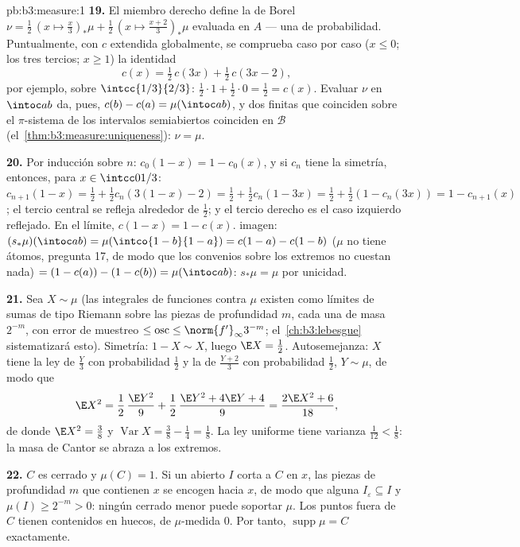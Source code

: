 \begin{solution}{pb:b3:measure:1}
\textbf{19.} El miembro derecho define la
 de Borel
$\nu = \frac12\,(x \mapsto \tfrac x3)_*\mu + \frac12\,(x
\mapsto \tfrac{x+2}3)_*\mu$ evaluada en $A$ --- una
 de probabilidad. Puntualmente,
con $c$ extendida globalmente, se comprueba caso por caso ($x \leq 0$;
los tres tercios; $x \geq 1$) la identidad
\[
c(x) = \tfrac12\,c(3x) + \tfrac12\,c(3x - 2),
\]
por ejemplo, sobre $\intcc{1/3}{2/3}$: $\frac12\cdot1 + \frac12\cdot0 =
\frac12 = c(x)$. Evaluar $\nu$ en $\intoc ab$ da, pues,
$c(b) - c(a) = \mu(\intoc ab)$, y dos
 finitas que coinciden sobre el
$\pi$-sistema de los intervalos semiabiertos coinciden en $\mathcal B$
(el~\cref{thm:b3:measure:uniqueness}): $\nu =
\mu$.

\textbf{20.} Por inducción sobre $n$: $c_0(1-x) = 1 - c_0(x)$, y si
$c_n$ tiene la simetría, entonces, para $x \in
\intcc0{1/3}$: $c_{n+1}(1 - x) = \frac12 + \frac12c_n(3(1-x)
- 2) = \frac12 + \frac12c_n(1 - 3x) = \frac12 + \frac12(1 -
c_n(3x)) = 1 - c_{n+1}(x)$; el tercio central se refleja alrededor de
$\frac12$; y el tercio derecho es el caso izquierdo reflejado. En el
límite, $c(1-x) = 1 - c(x)$.  imagen: $(s_*\mu)(\intoc ab)
= \mu(\intco{1-b}{1-a}) = c(1-a) - c(1-b)$ ($\mu$ no tiene átomos,
pregunta 17, de modo que los convenios sobre los extremos no cuestan
nada) $= (1 -
c(a)) - (1 - c(b)) = \mu(\intoc ab)$: $s_*\mu = \mu$ por unicidad.

\textbf{21.} Sea $X \sim \mu$ (las integrales de funciones
 contra $\mu$ existen como
límites de sumas de tipo Riemann sobre las piezas de profundidad $m$,
cada una de masa $2^{-m}$, con error de muestreo
$\leq \operatorname{osc} \leq
\norm{f'}_\infty3^{-m}$; el~\cref{ch:b3:lebesgue} sistematizará esto).
Simetría: $1 - X \sim X$, luego $\E X =
\frac12$. Autosemejanza: $X$ tiene la ley de $\frac Y3$ con probabilidad
$\frac12$ y la de $\frac{Y+2}3$ con probabilidad $\frac12$,
$Y \sim \mu$, de modo que
\[
\E X^2 = \frac12\,\frac{\E Y^2}9 + \frac12\,
\frac{\E Y^2 + 4\E Y + 4}{9} = \frac{2\E X^2 + 6}{18},
\]
de donde $\E X^2 = \frac38$ y $\operatorname{Var}X = \frac38
- \frac14 = \frac18$. La ley uniforme tiene varianza
$\frac1{12} < \frac18$: la masa de Cantor se abraza a los extremos.

\textbf{22.} $C$ es cerrado y $\mu(C) = 1$. Si un abierto $I$ corta a
$C$ en $x$, las piezas de profundidad $m$ que contienen $x$ se encogen
hacia $x$, de modo que alguna $I_\varepsilon \subseteq I$ y $\mu(I) \geq
2^{-m} > 0$: ningún cerrado menor puede soportar $\mu$. Los puntos fuera
de $C$ tienen  contenidos en
huecos, de $\mu$-medida $0$. Por tanto, $\operatorname{supp}\mu = C$
exactamente.


\end{solution}
